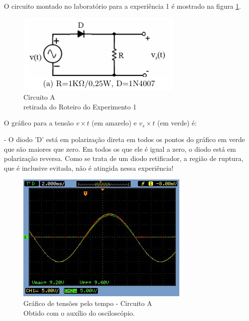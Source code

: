 \documentclass[10pt, final, a4paper]{IEEEtran} %
\begin{document}
O circuito montado no laboratório para a experiência 1 é mostrado na figura \ref{ca}.

\begin{figure}[ht!]
	\captionsetup{justification=centering}
	\centering
	\includegraphics[width=0.8\linewidth]{imagens/circuitos_rel/ca.png}
	\caption{Circuito A\\ retirada do Roteiro do Experimento 1}
	\label{ca}
\end{figure}
\FloatBarrier

O gráfico para a tensão $v \times t$ (em amarelo) e $v_s \times t$ (em verde) é:

- O diodo 'D' está em polarização direta em todos os pontos do gráfico em verde que são maiores que zero. Em todos os que ele é igual a zero, o diodo está em polarização reversa. Como se trata de um diodo retificador, a região de ruptura, que é inclusive evitada, não é atingida nessa experiência!

\begin{figure}[ht!]
	\captionsetup{justification=centering}
	\centering
	\includegraphics[width=0.8\linewidth]{imagens/circuitos_resp/a01.jpg}
	\caption{Gráfico de tensões pelo tempo - Circuito A\\ Obtido com o auxílio do osciloscópio.}
	\label{a01}
\end{figure}
\FloatBarrier
\end{document}
